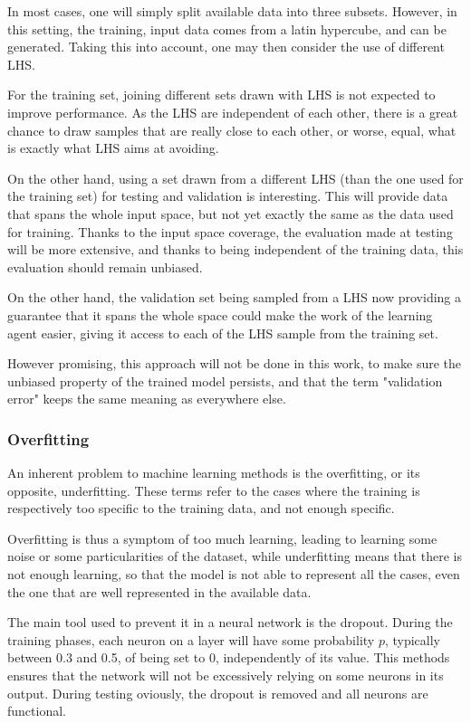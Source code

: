 In most cases, one will simply split available data into three subsets. However, in this setting, the training, input data comes from a latin hypercube, and can be generated. Taking this into account, one may then consider the use of different LHS.

For the training set, joining different sets drawn with LHS is not expected to improve performance. As the LHS are independent of each other, there is a great chance to draw samples that are really close to each other, or worse, equal, what is exactly what LHS aims at avoiding.

On the other hand, using a set drawn from a different LHS (than the one used for the training set) for testing and validation is interesting. This will provide data that spans the whole input space, but not yet exactly the same as the data used for training. Thanks to the input space coverage, the evaluation made at testing will be more extensive, and thanks to being independent of the training data, this evaluation should remain unbiased. 

On the other hand, the validation set being sampled from a LHS now providing a guarantee that it spans the whole space could make the work of the learning agent easier, giving it access to each of the LHS sample from the training set.

However promising, this approach will not be done in this work, to make sure the unbiased property of the trained model persists, and that the term "validation error" keeps the same meaning as everywhere else.

\subsubsection{Overfitting}

An inherent problem to machine learning methods is the overfitting, or its opposite, underfitting. These terms refer to the cases where the training is respectively too specific to the training data, and not enough specific.

Overfitting is thus a symptom of too much learning, leading to learning some noise or some particularities of the dataset, while underfitting means that there is not enough learning, so that the model is not able to represent all the cases, even the one that are well represented in the available data.

The main tool used to prevent it in a neural network is the dropout. During the training phases, each neuron on a layer will have some probability $p$, typically between 0.3 and 0.5, of being set to 0, independently of its value. This methods ensures that the network will not be excessively relying on some neurons in its output. During testing oviously, the dropout is removed and all neurons are functional.

